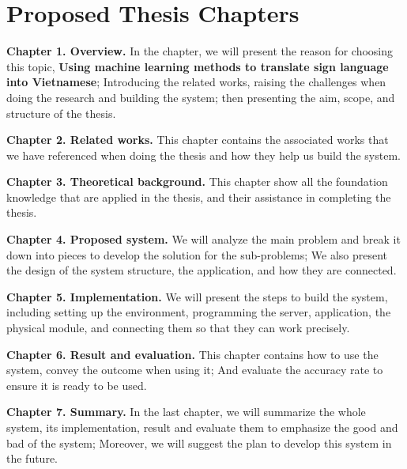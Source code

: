\chapter{Proposed Thesis Chapters}

\textbf{Chapter 1. Overview.} In the chapter, we will present the reason for choosing this topic, \textbf{Using machine learning methods to translate sign language into Vietnamese}; Introducing the related works, raising the challenges when doing the research and building the system; then presenting the aim, scope, and structure of the thesis.

\textbf{Chapter 2. Related works.} This chapter contains the associated works that we have referenced when doing the thesis and how they help us build the system.

\textbf{Chapter 3. Theoretical background.} This chapter show all the foundation knowledge that are applied in the thesis, and their assistance in completing the thesis. 

\textbf{Chapter 4. Proposed system.} We will analyze the main problem and break it down into pieces to develop the solution for the sub-problems; We also present the design of the system structure, the application, and how they are connected.


\textbf{Chapter 5. Implementation.} We will present the steps to build the system, including setting up the environment, programming the server, application, the physical module, and connecting them so that they can work precisely.

\textbf{Chapter 6. Result and evaluation.} This chapter contains how to use the system, convey the outcome when using it; And evaluate the accuracy rate to ensure it is ready to be used.

\textbf{Chapter 7. Summary.} In the last chapter, we will summarize the whole system, its implementation, result and evaluate them to emphasize the good and bad of the system; Moreover, we will suggest the plan to develop this system in the future.
